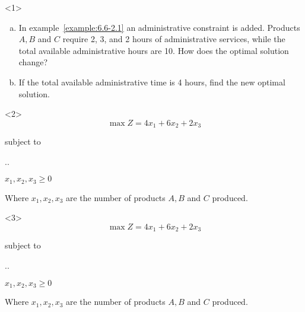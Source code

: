 \begin{frameExample}{\label{example:6.6-5.1}}{}
  \begin{onlyenv}<1>
    \begin{enumerate}[a)] \justifying \parskip4mm
      \item In example~\ref{example:6.6-2.1} an administrative constraint is added. Products $A, B$ and $C$ require 2, 3, and 2 hours of administrative services, while the total available administrative hours are 10. How does the optimal solution change?
      \item \label{example08} If the total available administrative time is 4 hours, find the new optimal solution.
    \end{enumerate}
  \end{onlyenv}


  \begin{onlyenv}<2>
    \[\max Z = 4x_1 +6x_2 +2x_3  \]

    {\centering
    subject to

    \vspace{3mm}
    \sysdelim..%

    $x_1, x_2, x_3 \geq 0$
    \par}

    Where   $x_1, x_2, x_3$ are the number of products $A, B$ and $C$ produced.
  \end{onlyenv}

  \begin{onlyenv}<3>
    \[\max Z = 4x_1 +6x_2 +2x_3  \]

    {\centering
    subject to

    \vspace{3mm}
    \sysdelim..%

    $x_1, x_2, x_3 \geq 0$
    \par}

    Where   $x_1, x_2, x_3$ are the number of products $A, B$ and $C$ produced.
  \end{onlyenv}
\end{frameExample}


